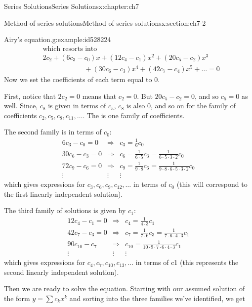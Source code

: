 \documentclass[oneside,10pt,]{book}
\numberwithin{equation}{section}
\numberwithin{equation}{section}
\newcommand{\amp}{&}
\begin{document}
\begin{chapterptx}{Series Solutions}{}{Series Solutions}{}{}{x:chapter:ch7}
\begin{sectionptx}{Method of series solutions}{}{Method of series solutions}{}{}{x:section:ch7-2}
\begin{example}{Airy's equation.}{g:example:id528224}
\begin{align*}
\amp\text{which resorts into}\\
\amp2c_2 + (6c_3 - c_0)x + (12c_4 - c_1)x^2 + (20c_5 - c_2)x^3 \\
\amp\hspace{1in}+ (30c_6 - c_3)x^4 + (42c_7 - c_4)x^5 + \ldots = 0
\end{align*}
Now we set the coefficients of each term equal to 0.%
\par
First, notice that \(2c_2 =0\) means that \(c_2 = 0\). But \(20c_5 - c_2 = 0\), and so \(c_5 =0\) as well. Since, \(c_8\) is given in terms of \(c_5\), \(c_8\) is also 0, and so on for the family of coefficients \(c_2, c_5, c_8, c_{11}, \ldots\). The is one family of coefficients.%
\par
The second family is in terms of \(c_0\):%
\begin{equation*}
\begin{array}{ccc}
6c_3 - c_0 = 0 \amp \Rightarrow \amp c_3 = \frac{1}{6} c_0 \\
30 c_6 - c_3 = 0 \amp \Rightarrow \amp c_6 = \frac{1}{6\cdot 5} c_3 = \frac{1}{6\cdot5\cdot3\cdot2} c_0 \\
72 c_9 - c_6 = 0 \amp \Rightarrow \amp c_9 = \frac{1}{9\cdot 8} c_6 = \frac{1}{9\cdot8\cdot6\cdot5\cdot3\cdot2}c_0\\
\vdots \amp \vdots \amp \vdots
\end{array}
\end{equation*}
which gives expressions for \(c_3, c_6, c_9, c_12, \ldots\) in terms of \(c_0\) (this will correspond to the first linearly independent solution).%
\par
The third family of solutions is given by \(c_1\):%
\begin{equation*}
\begin{array}{ccc}
12c_4 - c_1 = 0 \amp \Rightarrow \amp c_4 = \frac{1}{4\cdot3}c_1 \\
42c_7 - c_3 = 0 \amp \Rightarrow \amp c_7 = \frac{1}{7\cdot6}c_3 = \frac{1}{7\cdot6\cdot4\cdot3}c_1 \\
90c_{10} -  c_7 \amp \Rightarrow \amp c_{10} = \frac{1}{10\cdot9\cdot 7\cdot6\cdot 4\cdot3}c_1 \\
\vdots \amp \vdots \amp \vdots
\end{array}
\end{equation*}
which gives expressions for \(c_4, c_7, c_{10}, c_{13}, \ldots\) in terms of c\textunderscore{}1 (this represents the second linearly independent solution).%
\par
Then we are ready to solve the equation. Starting with our assumed solution of the form \(y = \sum c_k x^k\) and sorting into the three families we've identified, we get%

\end{example}
\end{sectionptx}
\end{chapterptx}
\end{document}
